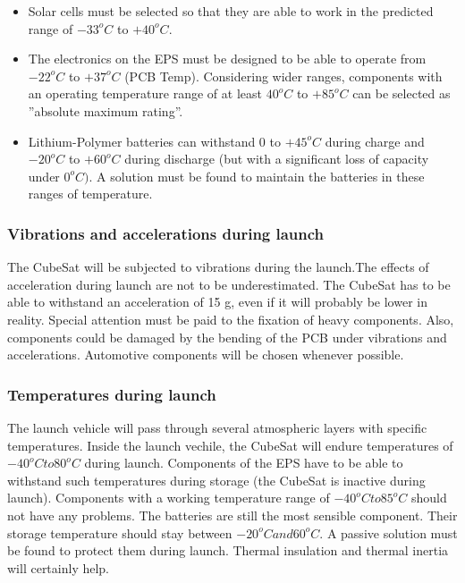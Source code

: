 \begin{itemize}
\item Solar cells must be selected so that they are able to work in the predicted range of $-33^{o}C$ to $+40^{o}C$.
\item The electronics on the EPS must be designed to be able to operate from $-22^{o}C$ to $+37^{o}C$ (PCB Temp). Considering wider ranges, components with an operating temperature range of at least  $40^{o}C$ to $+85^{o}C$ can be selected as ”absolute maximum rating”.
\item Lithium-Polymer batteries can withstand 0 to $+45^{o}C$ during charge and $-20^{o}C$ to $+60^{o}C$ during discharge (but with a significant loss of capacity under $0^{o}C)$. A solution must be found to maintain the batteries in these ranges of temperature.
\end{itemize}

\subsubsection{Vibrations and accelerations during launch} 

The CubeSat will be subjected to vibrations during the launch.The effects of acceleration during launch are not to be underestimated. The CubeSat has to be able to withstand an acceleration of 15 g, even if it will probably be lower in reality. Special attention must be paid to the fixation of heavy components. Also, components could be damaged by the bending of the PCB under vibrations and accelerations. Automotive components will be chosen whenever possible.

\subsubsection{Temperatures during launch} 

The launch vehicle will pass through several atmospheric layers with specific temperatures. Inside the launch vechile, the CubeSat will endure temperatures of $-40^{o}C to 80^{o}C$ during launch. Components of the EPS have to be able to withstand such temperatures during storage (the CubeSat is inactive during launch). Components with a working temperature range of $-40^{o}C to 85^{o}C$ should not have any problems.
The batteries are still the most sensible component. Their storage temperature should stay between $-20^{o}C and 60^{o}C$. A passive solution must be found to protect them during launch. Thermal insulation and thermal inertia will certainly help.




